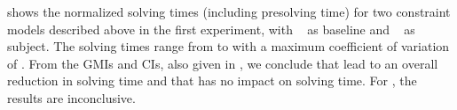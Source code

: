  shows the normalized
solving times (including presolving time) for two \glspl{constraint model}
described above in the first experiment, with ~\modelA{} as \gls{baseline} and ~\modelB{}
as \gls{subject}.
%
The solving times range from
\printMinSolvingTime{
  \SolvTechDisableDomConsLocsOfStatesPrePlusSolvingTimeSpeedupAllPrePlusSolvingTimeAvgMin,
  \SolvTechDisableDomConsLocsOfStatesPrePlusSolvingTimeSpeedupPrePlusSolvingTimeAvgMin,
  \SolvTechDisableDomConsOperandsOfNonSelectedMatchesPrePlusSolvingTimeSpeedupPrePlusSolvingTimeAvgMin,
  \SolvTechDisableImplConsInputOperandsNotTakingMinValuePrePlusSolvingTimeSpeedupPrePlusSolvingTimeAvgMin,
  \SolvTechDisableDomConsInterchDataChainsPrePlusSolvingTimeSpeedupPrePlusSolvingTimeAvgMin,
  \SolvTechDisableDomConsNullCopyMatchSelectionPrePlusSolvingTimeSpeedupPrePlusSolvingTimeAvgMin,
  \SolvTechDisableDomConsKillMatchSelectionPrePlusSolvingTimeSpeedupPrePlusSolvingTimeAvgMin
} to
\printMaxSolvingTime{
  \SolvTechDisableDomConsLocsOfStatesPrePlusSolvingTimeSpeedupAllPrePlusSolvingTimeAvgMax,
  \SolvTechDisableDomConsLocsOfStatesPrePlusSolvingTimeSpeedupPrePlusSolvingTimeAvgMax,
  \SolvTechDisableDomConsOperandsOfNonSelectedMatchesPrePlusSolvingTimeSpeedupPrePlusSolvingTimeAvgMax,
  \SolvTechDisableImplConsInputOperandsNotTakingMinValuePrePlusSolvingTimeSpeedupPrePlusSolvingTimeAvgMax,
  \SolvTechDisableDomConsInterchDataChainsPrePlusSolvingTimeSpeedupPrePlusSolvingTimeAvgMax,
  \SolvTechDisableDomConsNullCopyMatchSelectionPrePlusSolvingTimeSpeedupPrePlusSolvingTimeAvgMax,
  \SolvTechDisableDomConsKillMatchSelectionPrePlusSolvingTimeSpeedupPrePlusSolvingTimeAvgMax
} with a maximum coefficient of variation of
\numMaxOf{
  \SolvTechDisableDomConsLocsOfStatesPrePlusSolvingTimeSpeedupAllPrePlusSolvingTimeCvMax,
  \SolvTechDisableDomConsLocsOfStatesPrePlusSolvingTimeSpeedupPrePlusSolvingTimeCvMax,
  \SolvTechDisableDomConsOperandsOfNonSelectedMatchesPrePlusSolvingTimeSpeedupPrePlusSolvingTimeCvMax,
  \SolvTechDisableImplConsInputOperandsNotTakingMinValuePrePlusSolvingTimeSpeedupPrePlusSolvingTimeCvMax,
  \SolvTechDisableDomConsInterchDataChainsPrePlusSolvingTimeSpeedupPrePlusSolvingTimeCvMax,
  \SolvTechDisableDomConsNullCopyMatchSelectionPrePlusSolvingTimeSpeedupPrePlusSolvingTimeCvMax,
  \SolvTechDisableDomConsKillMatchSelectionPrePlusSolvingTimeSpeedupPrePlusSolvingTimeCvMax
}.
%
From the \glspl{GMI} and \glspl{CI}, also given in
, we conclude that
 lead to an overall reduction in solving time
and that  has no
impact on solving time.
%
For , the
results are inconclusive.

